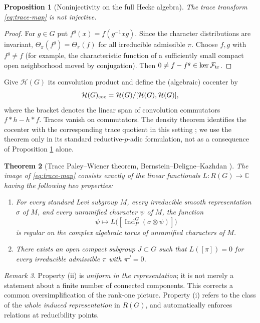 \documentclass[12pt,letterpaper]{amsart}
\numberwithin{equation}{section}
\newtheorem{theorem}{Theorem}[section]
\newtheorem{proposition}[theorem]{Proposition}
\theoremstyle{definition}
\theoremstyle{remark}
\newtheorem{remark}[theorem]{Remark}
\newcommand{\calH}{\mathcal H}
\newcommand{\Ind}{\operatorname{Ind}}
\begin{document}
\begin{proposition}[Noninjectivity on the full Hecke algebra]\label{prop:kernel}
The trace transform \eqref{eq:trace-map} is not injective.
\end{proposition}
\begin{proof}
For $g\in G$ put $f^g(x)=f(g^{-1}xg)$.  Since the character distributions are invariant, $\Theta_\pi(f^g)=\Theta_\pi(f)$ for all irreducible admissible $\pi$.  Choose $f,g$ with $f^g\ne f$ (for example, the characteristic function of a sufficiently small compact open neighborhood moved by conjugation).  Then $0\ne f-f^g\in\ker\mathcal F_{\rm tr}$.
\end{proof}

Give $\calH(G)$ its convolution product and define the (algebraic) cocenter by
\begin{equation}\label{eq:cocenter}
\calH(G)_{\rm coc}=\calH(G)/[\calH(G),\calH(G)],
\end{equation}
where the bracket denotes the linear span of convolution commutators $f*h-h*f$. Traces vanish on commutators. The density theorem identifies the cocenter with the corresponding trace quotient in this setting \cite{Ka86}; we use the theorem only in its standard reductive-$p$-adic formulation, not as a consequence of Proposition \ref{prop:kernel} alone.

\begin{theorem}[Trace Paley--Wiener theorem, Bernstein--Deligne--Kazhdan \cite{BDK86}]\label{thm:BDK}
The image of \eqref{eq:trace-map} consists exactly of the linear functionals $L:R(G)\to\mathbb C$ having the following two properties:
\begin{enumerate}[label=(\roman*),leftmargin=*]
\item For every standard Levi subgroup $M$, every irreducible smooth representation $\sigma$ of $M$, and every unramified character $\psi$ of $M$, the function
\[
\psi\longmapsto L\bigl([\Ind_P^G(\sigma\otimes\psi)]\bigr)
\]
is regular on the complex algebraic torus of unramified characters of $M$.
\item There exists an open compact subgroup $J\subset G$ such that $L([\pi])=0$ for every irreducible admissible $\pi$ with $\pi^J=0$.
\end{enumerate}
\end{theorem}
\begin{remark}
Property (ii) is \emph{uniform in the representation}; it is not merely a statement about a finite number of connected components. This corrects a common oversimplification of the rank-one picture.  Property (i) refers to the class of the \emph{whole induced representation} in $R(G)$, and automatically enforces relations at reducibility points.
\end{remark}
\end{document}
